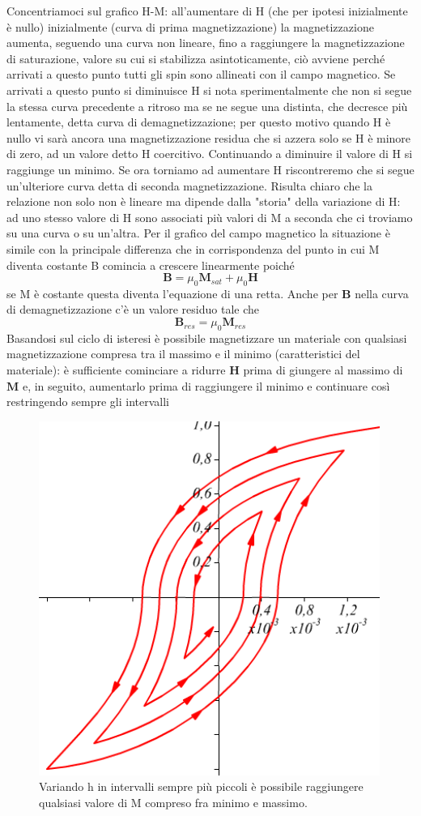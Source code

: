 \documentclass[
10pt, %
a4paper, %
oneside, %
headinclude,footinclude, %
BCOR5mm, %
]{scrartcl}
\begin{document}
\FloatBarrier
Concentriamoci sul grafico H-M: all'aumentare di H (che per ipotesi inizialmente è nullo) inizialmente (curva di prima magnetizzazione) la magnetizzazione aumenta, seguendo una curva non lineare, fino a raggiungere la magnetizzazione di saturazione, valore su cui si stabilizza asintoticamente, ciò avviene perché arrivati a questo punto tutti gli spin sono allineati con il campo magnetico. Se arrivati a questo punto si diminuisce H si nota sperimentalmente che non si segue la stessa curva precedente a ritroso ma se ne segue una distinta, che decresce più lentamente, detta curva di demagnetizzazione; per questo motivo quando H è nullo vi sarà ancora una magnetizzazione residua che si azzera solo se H è minore di zero, ad un valore detto H coercitivo. Continuando a diminuire il valore di H si raggiunge un minimo. Se ora torniamo ad aumentare H riscontreremo che si segue un'ulteriore curva detta di seconda magnetizzazione. Risulta chiaro che la relazione non solo non è lineare ma dipende dalla "storia" della variazione di H: ad uno stesso valore di H sono associati più valori di M a seconda che ci troviamo su una curva o su un'altra. Per il grafico del campo magnetico la situazione è simile con la principale differenza che in corrispondenza del punto in cui M diventa costante B comincia a crescere linearmente poiché
\[\mathbf{B} = \mu_0\mathbf{M}_{sat}+\mu_0\mathbf{H}\]
se M è costante questa diventa l'equazione di una retta. Anche per \(\mathbf{B}\) nella curva di demagnetizzazione c'è un valore residuo tale che
\[\mathbf{B}_{res} = \mu_0\mathbf{M}_{res}\] 
Basandosi sul ciclo di isteresi è possibile magnetizzare un materiale con qualsiasi magnetizzazione compresa tra il massimo e il minimo (caratteristici del materiale): è sufficiente cominciare a ridurre \(\mathbf{H}\) prima di giungere al massimo di \(\mathbf{M}\) e, in seguito, aumentarlo prima di raggiungere il minimo e continuare così restringendo sempre gli intervalli
\begin{figure}[h!]
	\centering
	\includegraphics[width=0.4\linewidth]{../images/loop_isteresi}
	\caption{Variando h in intervalli sempre più piccoli è possibile raggiungere qualsiasi valore di M compreso fra minimo e massimo.}
	\label{fig:loopisteresi}
\end{figure}
\end{document}
